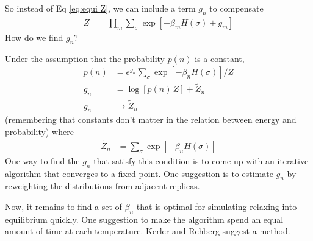 \documentclass[aps,prl,twocolumn]{revtex4-1}
\begin{document}
So instead of Eq \ref{eq:equi Z}, we can include a term $g_n$ to compensate
\begin{align}
	Z &= \prod_{m} \sum_\sigma \exp\left[ -\beta_m H(\sigma) +g_m \right]
\end{align}
How do we find $g_n$?

Under the assumption that the probability $p(n)$ is a constant,
\begin{align}
	p(n) &= e^{g_n} \sum_\sigma \exp\left[ -\beta_n H(\sigma) \right]/Z\\
	g_n &= \log[p(n)\,Z] + \tilde{Z}_n\\
	g_n &\rightarrow \tilde{Z}_n
\end{align}
(remembering that constants don't matter in the relation between energy and probability) where 
\begin{align}
	\tilde{Z}_n &= \sum_\sigma \exp\left[ -\beta_n H(\sigma) \right]
\end{align}
One way to find the $g_n$ that satisfy this condition is to come up with an iterative algorithm that converges to a fixed point. One suggestion is to estimate $g_n$ by reweighting the distributions from adjacent replicas.

Now, it remains to find a set of $\beta_n$ that is optimal for simulating relaxing into equilibrium quickly. One suggestion to make the algorithm spend an equal amount of time at each temperature. Kerler and Rehberg suggest a method.


\end{document}

